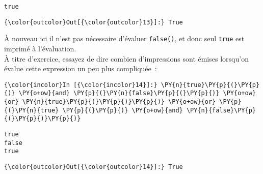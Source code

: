     \begin{Verbatim}[commandchars=\\\{\}]
true

    \end{Verbatim}

\begin{Verbatim}[commandchars=\\\{\}]
{\color{outcolor}Out[{\color{outcolor}13}]:} True
\end{Verbatim}
            
    À nouveau ici il n'est pas nécessaire d'évaluer \texttt{false()}, et
donc seul \texttt{true} est imprimé à l'évaluation.\\

    À titre d'exercice, essayez de dire combien d'impressions sont émises
lorsqu'on évalue cette expression un peu plus compliquée~:

    \begin{Verbatim}[commandchars=\\\{\}]
{\color{incolor}In [{\color{incolor}14}]:} \PY{n}{true}\PY{p}{(}\PY{p}{)} \PY{o+ow}{and} \PY{p}{(}\PY{n}{false}\PY{p}{(}\PY{p}{)} \PY{o+ow}{or} \PY{n}{true}\PY{p}{(}\PY{p}{)}\PY{p}{)} \PY{o+ow}{or} \PY{p}{(}\PY{n}{true} \PY{p}{(}\PY{p}{)} \PY{o+ow}{and} \PY{n}{false}\PY{p}{(}\PY{p}{)}\PY{p}{)}
\end{Verbatim}


    \begin{Verbatim}[commandchars=\\\{\}]
true
false
true

    \end{Verbatim}

\begin{Verbatim}[commandchars=\\\{\}]
{\color{outcolor}Out[{\color{outcolor}14}]:} True
\end{Verbatim}